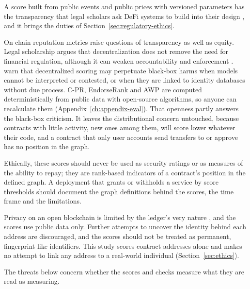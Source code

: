A score built from public events and public prices with versioned parameters has the transparency that legal scholars ask DeFi systems to build into their design \parencite{zetzsche2020defi}, and it brings the duties of Section~\ref{sec:regulatory-ethics}.


On-chain reputation metrics raise questions of transparency as well as equity. Legal scholarship argues that decentralization does not remove the need for financial regulation, although it can weaken accountability and enforcement \parencite{zetzsche2020defi}. \textcite{packin2024credit} warn that decentralized scoring may perpetuate black-box harms when models cannot be interpreted or contested, or when they are linked to identity databases without due process. \mbox{C-PR}, EndorseRank and AWP are computed deterministically from public data with open-source algorithms, so anyone can recalculate them (Appendix~\ref{ch:appendix-eval}). That openness partly answers the black-box criticism. It leaves the distributional concern untouched, because contracts with little activity, new ones among them, will score lower whatever their code, and a contract that only user accounts send transfers to or approve has no position in the graph.

Ethically, these scores should never be used as security ratings or as measures of the ability to repay; they are rank-based indicators of a contract's position in the defined graph. A deployment that grants or withholds a service by score thresholds should document the graph definitions behind the scores, the time frame and the limitations.

Privacy on an open blockchain is limited by the ledger's very nature \parencite{nakamoto2008bitcoin}, and the scores use public data only. Further attempts to uncover the identity behind each address are discouraged, and the scores should not be treated as permanent, fingerprint-like identifiers. This study scores contract addresses alone and makes no attempt to link any address to a real-world individual (Section~\ref{sec:ethics}).



The threats below concern whether the scores and checks measure what they are read as measuring.

